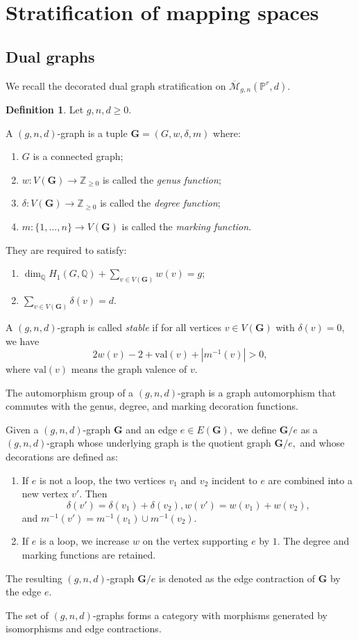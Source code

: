 \documentclass[12pt,reqno]{amsart}
\theoremstyle{definition}
\theoremstyle{definition}
\theoremstyle{definition}
\theoremstyle{definition}
\newtheorem{definition}[theorem]{Definition}
\newcommand{\ol}[1]{\overline{#1}}
\newcommand{\Mcal}{\mathcal{M}}
\newcommand{\Mbar}{\ol{\Mcal}}
\begin{document}
\section{Stratification of mapping spaces}\label{sec:graph}
\subsection{Dual graphs}
We recall the decorated dual graph stratification on \(\Mbar_{g,n}(\mathbb{P}^r,d)\).

\begin{definition}\cite[Definition 1.1]{vzdualcomplex}
  Let $g, n, d \geq 0$. 
  
  A $(g, n, d)$-graph is a tuple $\mathbf{G} = (G, w, \delta, m)$ where:
\begin{enumerate}
\item $G$ is a connected graph;
\item $w : V(\mathbf{G}) \to \mathbb{Z}_{\geq 0}$ is called the \textit{genus function};
\item $\delta: V(\mathbf{G}) \to \mathbb{Z}_{\geq 0}$ is called the \textit{degree function};
\item $m: \{1, \ldots, n\} \to V(\mathbf{G})$ is called the \textit{marking function}. 
\end{enumerate}
They are required to satisfy:
\begin{enumerate}[(1)]
\item $\dim_{\mathbb{Q}} H_1(G, \mathbb{Q}) + \sum_{v \in V(\mathbf{G})} w(v) = g$;
\item $\sum_{v \in V(\mathbf{G})} \delta(v) = d$.
\end{enumerate}
A $(g, n, d)$-graph is called \textit{stable} if for all vertices $v \in V(\mathbf{G})$ with $\delta(v) = 0$, we have
\[ 2 w(v) - 2 + \mathrm{val}(v) + |m^{-1}(v)| > 0, \]
where $\mathrm{val}(v)$ means the graph valence of $v$.

The automorphism group of a $(g,n,d)$-graph is a graph automorphism that commutes with the genus, degree, and marking decoration functions.

Given a $(g,n,d)$-graph $\mathbf{G}$ and an edge $e\in E(\mathbf{G}),$ we define $\mathbf{G}/e$ as a $(g,n,d)$-graph whose underlying graph is the quotient graph $\mathbf{G}/e,$ and whose decorations are defined as: \begin{enumerate}
    \item If $e$ is not a loop, the two vertices $v_1$ and $v_2$ incident to $e$ are combined into a new vertex $v'$. Then $$\delta(v') = \delta(v_1) + \delta(v_2), w(v') = w(v_1) + w(v_2),$$ and $m^{-1}(v') = m^{-1}(v_1) \cup m^{-1}(v_2)$.
    \item If $e$ is a loop, we increase $w$ on the vertex supporting $e$ by $1.$ The degree and marking functions are retained.
\end{enumerate}
The resulting $(g,n,d)$-graph $\mathbf{G}/e$ is denoted as the edge contraction of $\mathbf{G}$ by the edge $e.$

The set of $(g,n,d)$-graphs forms a category with morphisms generated by isomorphisms and edge contractions.
\end{definition}
\end{document}
